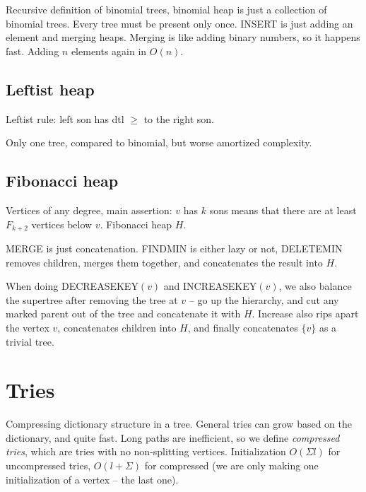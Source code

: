 \begin{multicols}{3}
Recursive definition of binomial trees, binomial heap is just a collection of
binomial trees. Every tree must be present only once. INSERT is just adding
an element and merging heaps. Merging is like adding binary numbers, so it happens
fast. Adding $n$ elements again in $O(n)$.

\subsection{Leftist heap}


Leftist rule: left son has dtl $≥$ to the right son.

Only one tree, compared to binomial, but worse amortized complexity.

\subsection{Fibonacci heap}

Vertices of any degree, main assertion: $v$ has $k$ sons means that there are
at least $F_{k+2}$ vertices below $v$. Fibonacci heap $H$.

MERGE is just concatenation. FINDMIN is either lazy or not, DELETEMIN removes
children, merges them together, and concatenates the result into $H$.

When doing DECREASEKEY$(v)$ and INCREASEKEY$(v)$, we also balance the
supertree after removing the tree at $v$ -- go up the hierarchy, and
cut any marked parent out of the tree and concatenate it with
$H$. Increase also rips apart the vertex $v$, concatenates children
into $H$, and finally concatenates $\{v\}$ as a trivial tree.

\section{Tries}

Compressing dictionary structure in a tree. General tries can grow
based on the dictionary, and quite fast. Long paths are inefficient,
so we define {\it compressed tries}, which are tries with no
non-splitting vertices. Initialization $O(Σl)$ for uncompressed tries,
$O(l + Σ)$ for compressed (we are only making one initialization of a
vertex -- the last one).



\end{multicols}
